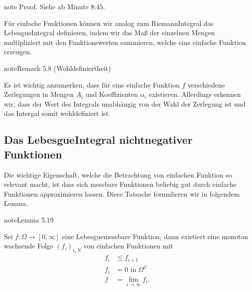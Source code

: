 \documentclass[letterpaper,10pt,german]{jupyterBook}
\begin{document}
\begin{sphinxadmonition}{note}
\sphinxAtStartPar
Proof. Siehe  ab Minute 8:45.
\end{sphinxadmonition}

\sphinxAtStartPar
Für einfache Funktionen können wir analog zum Riemann\sphinxhyphen{}Integral das Lebesgue\sphinxhyphen{}Integral definieren, indem wir das Maß der einzelnen Mengen multipliziert mit den Funktionswerten summieren, welche eine einfache Funktion erzeugen.
\label{masstheorie/lebesgue_integral:remark-10}
\begin{sphinxadmonition}{note}{Remark 5.8 (Wohldefiniertheit)}



\sphinxAtStartPar
Es ist wichtig anzumerken, dass für eine einfache Funktion \(f\) verschiedene Zerlegungen in Mengen \(A_i\) und Koeffizienten \(\alpha_i\) existieren. Allerdings erkennen wir, dass der Wert des Integrals unabhängig von der Wahl der Zerlegung ist und das Intergal somit wohldefiniert ist.
\end{sphinxadmonition}


\subsection{Das Lebesgue\sphinxhyphen{}Integral nicht\sphinxhyphen{}negativer Funktionen}
\label{\detokenize{masstheorie/lebesgue_integral:das-lebesgue-integral-nicht-negativer-funktionen}}
\sphinxAtStartPar
Die wichtige Eigenschaft, welche die Betrachtung von einfachen Funktion so relevant macht, ist dass sich messbare Funktionen beliebig gut durch einfache Funktionen approximieren lassen. Diese Tatsache formulieren wir in folgendem Lemma.
\label{masstheorie/lebesgue_integral:lem:simplefun}
\begin{sphinxadmonition}{note}{Lemma 5.19}



\sphinxAtStartPar
Sei \(f \colon \Omega \to [0,\infty]\) eine Lebesgue\sphinxhyphen{}messbare Funktion, dann existiert eine monoton wachsende Folge \((f_i)_{i_\in N}\) von einfachen Funktionen mit
\begin{equation*}
\begin{split}f_i&\leq f_{i+1}\\
f_i &= 0\text{ in }\Omega^C\\
f&=\lim_{i\to\infty} f_i.\end{split}
\end{equation*}\end{sphinxadmonition}
\end{document}
